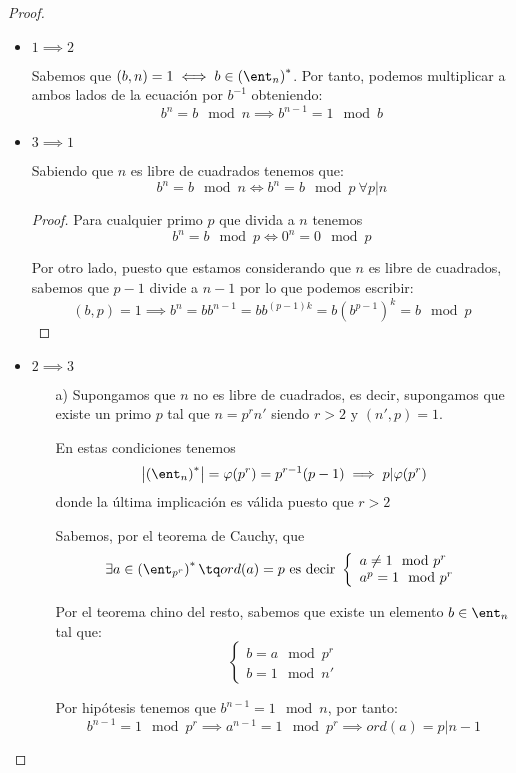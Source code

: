 \begin{proof}
\begin{itemize}
\item $1 \implies 2$

Sabemos que $(b,n)=1 \iff b \in\left(\ent_n\right)^*$. Por tanto, podemos multiplicar a ambos lados de la ecuación por $b^{-1}$ obteniendo:
\[b^n = b \mod n \implies b^{n-1}=1 \mod b\]

\item $3 \implies 1$

Sabiendo que $n$ es libre de cuadrados tenemos que:
\[b^n = b \mod n \iff b^n = b \mod p \ \forall p|n\]

\begin{proof}
Para cualquier primo $p$ que divida a $n$ tenemos 
\[b^n = b \mod p \iff 0^n=0 \mod p \]

Por otro lado, puesto que estamos considerando que $n$ es libre de cuadrados, sabemos que $p-1$ divide a $n-1$ por lo que podemos escribir:
\[(b,p)=1 \implies b^n=bb^{n-1} = bb^{(p-1)k}=b\left(b^{p-1}\right)^k=b\mod p\]
\end{proof}

\item $2 \implies 3$

\begin{itemize}
\item[a)] Supongamos que $n$ no es libre de cuadrados, es decir, supongamos que existe un primo $p$ tal que $n=p^rn'$ siendo $r>2$ y $(n',p)=1$.

En estas condiciones tenemos
\[\left| \left(\ent_n\right)^*\right| = \varphi(p^r)=p^{r-1}(p-1) \implies p|\varphi(p^r)\]
donde la última implicación es válida puesto que $r>2$

Sabemos, por el teorema de Cauchy, que
\[\exists a \in \left(\ent_{p^r}\right)^* \tq ord(a)=p \text{ es decir } \left\{\begin{array}{l}a\neq 1 \mod p^r \\ a^p=1 \mod p^r \end{array}\right.\]

Por el teorema chino del resto, sabemos que existe un elemento $b \in \ent_n$ tal que:
\[\left\{\begin{array}{l}b=a\mod p^r \\ b=1 \mod n' \end{array}\right.\]

Por hipótesis tenemos que $b^{n-1}=1 \mod n$, por tanto:
\[b^{n-1} = 1 \mod p^r \implies a^{n-1} = 1 \mod p^r \implies ord(a) =p|n-1\]


\end{itemize}
\end{itemize}
\end{proof}
